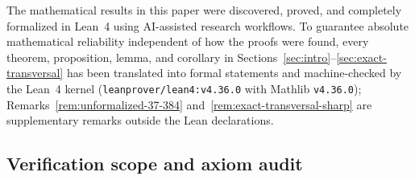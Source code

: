 \documentclass[11pt]{article}
\theoremstyle{definition}
\theoremstyle{remark}
\begin{document}
The mathematical results in this paper were discovered, proved, and completely formalized in Lean~4 using AI-assisted research workflows. To guarantee absolute mathematical reliability independent of how the proofs were found, every theorem, proposition, lemma, and corollary in Sections~\ref{sec:intro}--\ref{sec:exact-transversal} has been translated into formal statements and machine-checked by the Lean~4 kernel (\texttt{leanprover/lean4:v4.36.0} with Mathlib \texttt{v4.36.0}); Remarks~\ref{rem:unformalized-37-384} and~\ref{rem:exact-transversal-sharp} are supplementary remarks outside the Lean declarations.

\subsection{Verification scope and axiom audit}
\end{document}

